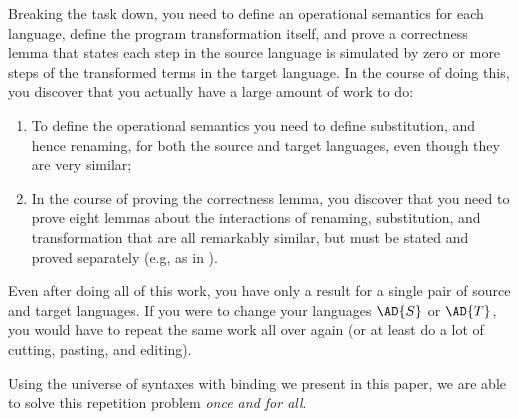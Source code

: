 Breaking the task down, you need to define an operational semantics for
each language, define the program transformation itself, and prove a
correctness lemma that states each step in the source language is
simulated by zero or more steps of the transformed terms in the target
language. In the course of doing this, you discover that you actually
have a large amount of work to do:

\begin{enumerate}
\item To define the operational semantics you need to define
  substitution, and hence renaming, for both the source and target
  languages, even though they are very similar;
\item In the course of proving the correctness lemma, you discover
  that you need to prove eight lemmas about the interactions of
  renaming, substitution, and transformation that are all remarkably
  similar, but must be stated and proved separately (e.g, as in
  \cite{benton2012strongly}).
\end{enumerate}

Even after doing all of this work, you have only a result for a single
pair of source and target languages. If you were to change your
languages $\AD{S}$ or $\AD{T}$, you would have to repeat the same work
all over again (or at least do a lot of cutting, pasting, and
editing).

Using the universe of syntaxes with binding we present in this paper,
we are able to solve this repetition problem \emph{once and for all}.


